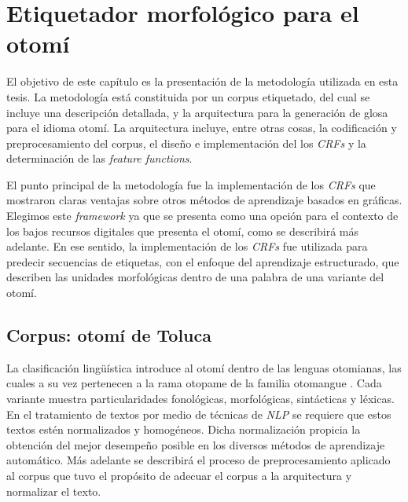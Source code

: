 \documentclass[letterpaper,12pt,oneside]{book}
\theoremstyle{definition}
\begin{document}


\chapter{Etiquetador morfológico para el otomí} \label{chap:metodology}

El objetivo de este capítulo es la presentación de la metodología utilizada en esta tesis. La metodología está constituida por un corpus etiquetado, del cual se incluye una descripción detallada, y la arquitectura para la generación de glosa para el idioma otomí. La arquitectura incluye, entre otras cosas, la codificación y preprocesamiento del corpus, el diseño e implementación del los \textit{CRFs} y la determinación de las \textit{feature functions}.

El punto principal de la metodología fue la implementación de los \textit{CRFs} que mostraron claras ventajas sobre otros métodos de aprendizaje basados en gráficas. Elegimos este \textit{framework} ya que se presenta como una opción para el contexto de los bajos recursos digitales que presenta el otomí, como se describirá más adelante. En ese sentido, la implementación de los \textit{CRFs} fue utilizada para predecir secuencias de etiquetas, con el enfoque del aprendizaje estructurado, que describen las unidades morfológicas dentro de una palabra de una variante del otomí. 

\section{Corpus: otomí de Toluca}

La clasificación lingüística introduce al otomí dentro de las lenguas otomianas, las cuales a su vez pertenecen a la rama otopame de la familia otomangue \citep{barrientos2004otomies}. Cada variante muestra particularidades fonológicas, morfológicas, sintácticas y léxicas. En el tratamiento de textos por medio de técnicas de \textit{NLP} se requiere que estos textos estén normalizados y homogéneos. Dicha normalización propicia la obtención del mejor desempeño posible en los diversos métodos de aprendizaje automático. Más adelante se describirá el proceso de preprocesamiento aplicado al corpus que tuvo el propósito de adecuar el corpus a la arquitectura y normalizar el texto.
\end{document}
